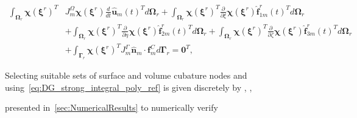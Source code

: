 \documentclass[12pt,Bold,letterpaper,TexShade]{mcgilletdclass}
\numberwithin{equation}{section}
\begin{document}
\begin{equation} \label{eq:DG_strong_integral_poly_ref}
\begin{split}
\int_{\boldsymbol \Omega_r}
\boldsymbol \chi(\boldsymbol \xi^r)^T &
J_m^{\Omega} \boldsymbol \chi(\boldsymbol \xi^r) \frac{d}{dt} \hat{\boldsymbol u}_m(t)^T
d \boldsymbol \Omega_r
+ \int_{\boldsymbol \Omega_r} \boldsymbol \chi(\boldsymbol \xi^r)^T \frac{\partial}{\partial \xi} \boldsymbol \chi(\boldsymbol \xi^r) \hat{\boldsymbol f}^r_{1m}(t)^T d \boldsymbol \Omega_r \\
& + \int_{\boldsymbol \Omega_r} \boldsymbol \chi(\boldsymbol \xi^r)^T \frac{\partial}{\partial \eta} \boldsymbol \chi(\boldsymbol \xi^r) \hat{\boldsymbol f}^r_{2m}(t)^T d \boldsymbol \Omega_r
+ \int_{\boldsymbol \Omega_r} \boldsymbol \chi(\boldsymbol \xi^r)^T \frac{\partial}{\partial \zeta} \boldsymbol \chi(\boldsymbol \xi^r) \hat{\boldsymbol f}^r_{3m}(t)^T d \boldsymbol \Omega_r \\
& + \int_{\boldsymbol \Gamma_r} 
\boldsymbol \chi(\boldsymbol \xi^r)^T 
J_m^{\Gamma} \hat{\boldsymbol n}_m \cdot \boldsymbol f^{C}_m
d \boldsymbol \Gamma_r = \boldsymbol 0^T,
\end{split}
\end{equation}

Selecting suitable sets of surface and volume cubature nodes and using~\eqref{eq:DG_strong_integral_poly_ref} is given discretely by \cite[eq. ({\color{blue}4.24})]{castonguay2012}, \cite[eq. ({\color{blue}23})]{williams2014a},

presented in~\autoref{sec:NumericalResults} to numerically verify
\end{document}
